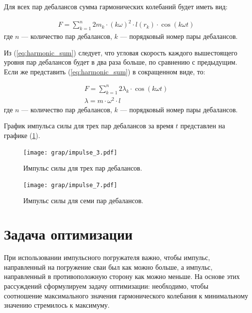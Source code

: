 Для всех пар дебалансов сумма гармонических колебаний будет иметь вид:

\begin{equation}\label{eq:harmonic_sum}
    \begin{gathered}
        F = \sum\limits_{k = 1}^n 2 m_k \cdot (k \omega)^2 \cdot l(r_k) \cdot \cos (k \omega t)
    \end{gathered}
\end{equation}
\noindent где $n$ --- количество пар дебалансов, $k$ --- порядковый номер пары дебалансов.

Из (\ref{eq:harmonic_sum}) следует, что угловая скорость каждого вышестоящего уровня пар дебалансов будет в два раза больше, по сравнению с предыдущим.
Если же представить (\ref{eq:harmonic_sum}) в сокращенном виде, то:

\begin{equation}\label{eq:short_harmonic_sum}
    \begin{gathered}
        F = \sum\limits_{k = 1}^n 2 \lambda_k \cdot \cos (k \omega t) \\
        \lambda = m \cdot \omega^2 \cdot l
    \end{gathered}
\end{equation}
\noindent где $n$ --- количество пар дебалансов, $k$ --- порядковый номер пары дебалансов.

График импульса силы для трех пар дебалансов за время $t$ представлен на графике (\ref{grap:impulse_3}).

\begin{figure}[h]
    \centering
    \texttt{[image: grap/impulse\_3.pdf]}
    \caption{Импульс силы для трех пар дебалансов.}
    \label{grap:impulse_3}
\end{figure}

\begin{figure}[h]
    \centering
    \texttt{[image: grap/impulse\_7.pdf]}
    \caption{Импульс силы для семи пар дебалансов.}
    \label{grap:impulse_7}
\end{figure}


\clearpage
\section{Задача оптимизации}

При использовании импульсного погружателя важно, чтобы импульс, направленный на погружение сваи был как можно больше,
а импульс, направленный в противоположную сторону как можно меньше. На основе этих рассуждений сформулируем задачу оптимизации:
необходимо, чтобы соотношение максимального значения гармонического колебания к минимальному значению стремилось к максимуму.

